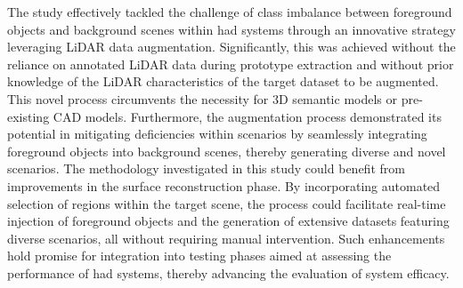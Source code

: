 The study effectively tackled the challenge of class imbalance between foreground objects and background scenes within \acrfull{had} systems through an innovative strategy leveraging LiDAR data augmentation. Significantly, this was achieved without the reliance on annotated LiDAR data during prototype extraction and without prior knowledge of the LiDAR characteristics of the target dataset to be augmented. This novel process circumvents the necessity for 3D semantic models or pre-existing CAD models. Furthermore, the augmentation process demonstrated its potential in mitigating deficiencies within scenarios by seamlessly integrating foreground objects into background scenes, thereby generating diverse and novel scenarios. 
The methodology investigated in this study could benefit from improvements in the surface reconstruction phase. By incorporating automated selection of regions within the target scene, the process could facilitate real-time injection of foreground objects and the generation of extensive datasets featuring diverse scenarios, all without requiring manual intervention. Such enhancements hold promise for integration into testing phases aimed at assessing the performance of \acrfull{had} systems, thereby advancing the evaluation of system efficacy.

